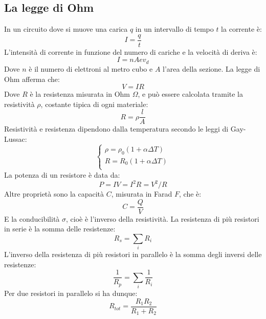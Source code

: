 \documentclass{article}
\begin{document}
\subsection{La legge di Ohm}
In un circuito dove si muove una carica $q$ in un intervallo di tempo $t$ la corrente è:
\begin{equation}
    I=\frac{q}{t}
\end{equation}
L'intensità di corrente in funzione del numero di cariche e la velocità di deriva è:
\begin{equation}
    I=nAev_d
\end{equation}
Dove $n$ è il numero di elettroni al metro cubo e $A$ l'area della sezione.
La legge di Ohm afferma che:
\begin{equation}
    V=IR
\end{equation}
Dove $R$ è la resistenza misurata in Ohm $\Omega$, e può essere calcolata tramite la resistività $\rho$, costante tipica di ogni materiale:
\begin{equation}
    R=\rho \frac{l}{A}
\end{equation}
Resistività e resistenza dipendono dalla temperatura secondo le leggi di Gay-Lussac:
\begin{equation}
    \begin{cases}
        \rho=\rho_0(1+\alpha \Delta T)\\
        R=R_0(1+\alpha \Delta T)\\
    \end{cases}
\end{equation}
La potenza di un resistore è data da:
\begin{equation}
    P=IV=I^2R=V^2/R
\end{equation}
Altre proprietà sono la capacità $C$, misurata in Farad $F$, che è:
\begin{equation}
    C=\frac{Q}{V}
\end{equation}
E la conducibilità $\sigma$, cioè è l'inverso della resistività.
La resistenza di più resistori in serie è la somma delle resistenze:
\begin{equation}
    R_s=\sum_i R_i
\end{equation}
L'inverso della resistenza di più resistori in parallelo è la somma degli inversi delle resistenze:
\begin{equation}
    \frac{1}{R_p}=\sum_i \frac{1}{R_i}
\end{equation}
Per due resistori in parallelo si ha dunque:
\begin{equation}
    R_{tot}=\frac{R_1 R_2}{R_1+R_2}
\end{equation}
\end{document}

